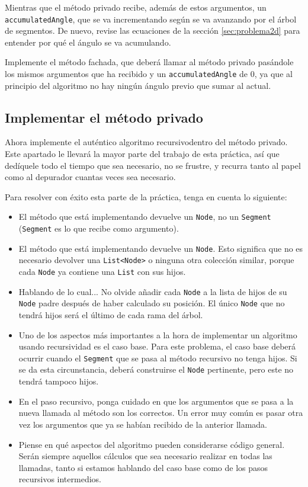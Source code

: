 \documentclass[10pt,a4paper,spanish]{article}
\newcommand{\code}[1]{\texttt{#1}}
\begin{document}
Mientras que el método privado recibe, además de estos argumentos, un \code{accumulatedAngle}, que se va incrementando según se va avanzando por el árbol de segmentos. De nuevo, revise las ecuaciones de la sección \ref{sec:problema2d} para entender por qué el ángulo se va acumulando.

Implemente el método fachada, que deberá llamar al método privado pasándole los mismos argumentos que ha recibido y un \code{accumulatedAngle} de 0, ya que al principio del algoritmo no hay ningún ángulo previo que sumar al actual.

\subsection{Implementar el método privado}

Ahora implemente el auténtico algoritmo recursivodentro del método privado. Este apartado le llevará la mayor parte del trabajo de esta práctica, así que dedíquele todo el tiempo que sea necesario, no se frustre, y recurra tanto al papel como al depurador cuantas veces sea necesario.

Para resolver con éxito esta parte de la práctica, tenga en cuenta lo siguiente:

\begin{itemize}
    \item El método que está implementando devuelve un \code{Node}, no un \code{Segment} (\code{Segment} es lo que recibe como argumento).
    \item El método que está implementando devuelve un \code{Node}. Esto significa que no es necesario devolver una \code{List<Node>} o ninguna otra colección similar, porque cada \code{Node} ya contiene una \code{List} con sus hijos.
    \item Hablando de lo cual... No olvide añadir cada \code{Node} a la lista de hijos de su \code{Node} padre después de haber calculado su posición. El único \code{Node} que no tendrá hijos será el último de cada rama del árbol.
    \item Uno de los aspectos más importantes a la hora de implementar un algoritmo usando recursividad es el caso base. Para este problema, el caso base deberá ocurrir cuando el \code{Segment} que se pasa al método recursivo no tenga hijos. Si se da esta circunstancia, deberá construirse el \code{Node} pertinente, pero este no tendrá tampoco hijos.
    \item En el paso recursivo, ponga cuidado en que los argumentos que se pasa a la nueva llamada al método son los correctos. Un error muy común es pasar otra vez los argumentos que ya se habían recibido de la anterior llamada.
    \item Piense en qué aspectos del algoritmo pueden considerarse código general. Serán siempre aquellos cálculos que sea necesario realizar en todas las llamadas, tanto si estamos hablando del caso base como de los pasos recursivos intermedios.
\end{itemize}
\end{document}
